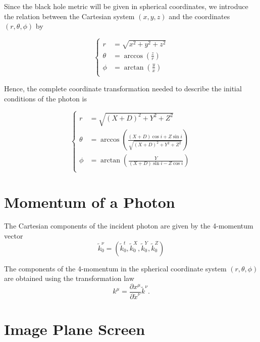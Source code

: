 Since the black hole metric will be given in spherical coordinates, we introduce the relation between the Cartesian system $(x,y,z)$ and the coordinates $(r,\theta, \phi)$ by

\begin{equation}
\begin{cases}
r &= \sqrt{x^2 + y^2 + z^2} \\
\theta &= \arccos \left( \frac{z}{r}\right)\\
\phi &= \arctan \left( \frac{y}{x} \right) \\
\end{cases}
\end{equation}

Hence, the complete coordinate transformation needed to describe the initial conditions of the photon is 

\begin{equation}
\begin{cases}
r &= \sqrt{(X+D)^2 + Y^2 + Z^2} \\
\theta &= \arccos \left( \frac{(X+D) \cos i + Z \sin i}{\sqrt{(X+D)^2 + Y^2 + Z^2}}\right)\\
\phi &= \arctan \left( \frac{Y}{(X+D)\sin i - Z \cos i} \right) \\
\end{cases} \label{CoordinateTransformation}
\end{equation}

\section{Momentum of a Photon}

The Cartesian components of the incident photon are given by the 4-momentum vector
\begin{equation}
\tilde{k}^\nu_0 =\left( \tilde{k}^t_0, \tilde{k}^X_0, \tilde{k}^Y_0, \tilde{k}^Z_0 \right)
\end{equation}

The components of the 4-momentum in the spherical coordinate system $(r,\theta,\phi)$ are obtained using the transformation law
\begin{equation}
k^\mu = \frac{\partial x^\mu}{\partial \tilde{x}^\nu} \tilde{k}^\nu.
\label{kTransformation}
\end{equation}

\section{Image Plane Screen}

